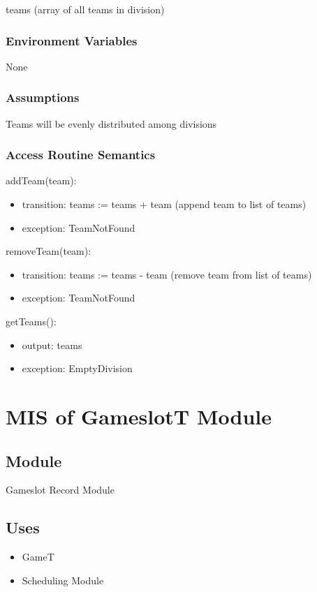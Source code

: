 \documentclass[12pt, titlepage]{article}
\begin{document}
teams (array of all teams in division)

\subsubsection{Environment Variables}

None

\subsubsection{Assumptions}

Teams will be evenly distributed among divisions

\subsubsection{Access Routine Semantics}

\noindent addTeam(team):
\begin{itemize}
  \item transition: teams := teams + team (append team to list of teams)
  \item exception: TeamNotFound
\end{itemize}

\noindent removeTeam(team):
\begin{itemize}
  \item transition: teams := teams - team (remove team from list of teams)
  \item exception: TeamNotFound
\end{itemize}

\noindent getTeams():
\begin{itemize}
  \item output: teams
  \item exception: EmptyDivision
\end{itemize}

\newpage

\section{MIS of GameslotT Module} \label{GameslotT}

\subsection{Module}

Gameslot Record Module

\subsection{Uses}
\begin{itemize}
  \item GameT
  \item Scheduling Module
\end{itemize}
\end{document}
